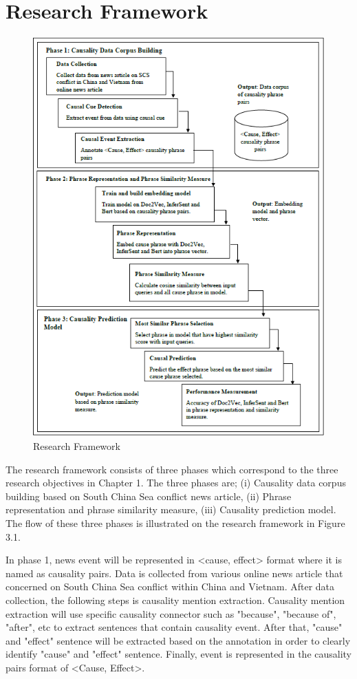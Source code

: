 \documentclass[twoside]{utmthesis}
\begin{document}
\section{Research Framework}
\begin{figure}[H]
	\centering
	\includegraphics[width=1.0\linewidth,height=0.9\textheight]{"diagram/Research Framework"}
	\caption{Research Framework}
	\label{fig:research-framework2}
\end{figure}

The research framework consists of three phases which correspond to the three research objectives in Chapter 1. The three phases are; (i) Causality data corpus building based on South China Sea conflict news article, (ii) Phrase representation and phrase similarity measure, (iii) Causality prediction model. The flow of these three phases is illustrated on the research framework in Figure 3.1.

In phase 1, news event will be represented in <cause, effect> format where it is named as causality pairs. Data is collected from various online news article that concerned on South China Sea conflict within China and Vietnam. After data collection, the following steps is causality mention extraction. Causality mention extraction will use specific causality connector such as "because", "because of", "after", etc to extract sentences that contain causality event. After that, "cause" and "effect" sentence will be extracted based on the annotation in order to clearly identify "cause" and "effect" sentence. Finally, event is represented in the causality pairs format of <Cause, Effect>. 
\end{document}

